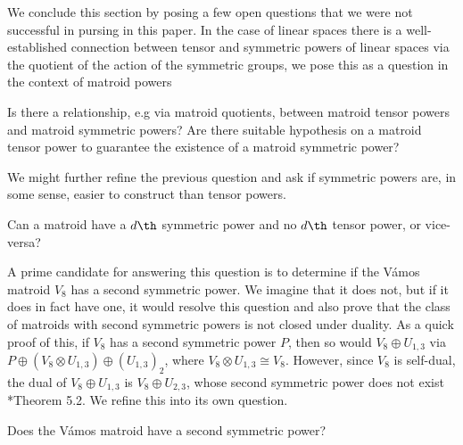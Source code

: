 We conclude this section by posing a few open questions that we were not successful in pursing in this paper. In the case of linear spaces there is a well-established connection between tensor and symmetric powers of linear spaces via the quotient of the action of the symmetric groups, we pose this as a question in the context of matroid powers

\begin{question}
Is there a relationship, e.g via matroid quotients, between matroid tensor powers and matroid symmetric powers? Are there suitable hypothesis on a matroid tensor power to guarantee the existence of a matroid symmetric power?
\end{question}

 We might further refine the previous question and ask if symmetric powers are, in some sense,  easier to construct than tensor powers.
\begin{question}\label{question:symprodsWithoutTensor}
Can a matroid have a $d \th$ symmetric power and no $d\th$ tensor power, or vice-versa?
\end{question}

A prime candidate for answering this question is to determine if the V\'amos matroid $V_8$ has a second symmetric power. We imagine that it does not, but if it does in fact have one, it would resolve this question and also prove that the class of matroids with second symmetric powers is not closed under duality. As a quick proof of this, if $V_8$ has a second symmetric power $P$, then so would $V_8\oplus U_{1,3}$ via $P\oplus (V_8\otimes U_{1,3})\oplus (U_{1,3})_2$, where $V_8\otimes U_{1,3}\cong V_8$. However, since $V_8$ is self-dual, the dual of $V_8\oplus U_{1,3}$ is $V_8\oplus U_{2,3}$, whose second symmetric power does not exist \cite{DR19}*{Theorem 5.2}. We refine this into its own question.

\begin{question}\label{question:vamosSym2}
Does the V\'amos matroid have a second symmetric power?
\end{question}


